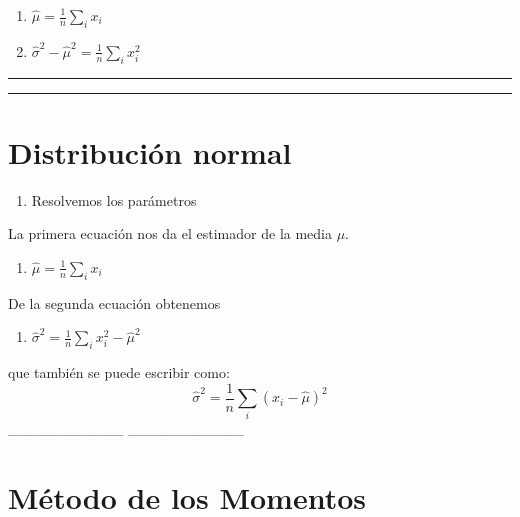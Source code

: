 \documentclass[
]{book}
\providecommand{\tightlist}{%
  \setlength{\itemsep}{0pt}\setlength{\parskip}{0pt}}
\begin{document}
\begin{enumerate}
\def\labelenumi{\alph{enumi}.}
\tightlist
\item
  \(\hat{\mu}=\frac{1}{n}\sum_i x_i\)
\item
  \(\hat{\sigma}^2-\hat{\mu}^2=\frac{1}{n}\sum_i x^2_i\)
\end{enumerate}

\begin{center}\rule{0.5\linewidth}{0.5pt}\end{center}

\begin{center}\rule{0.5\linewidth}{0.5pt}\end{center}

\hypertarget{distribuciuxf3n-normal-14}{%
\section{Distribución normal}\label{distribuciuxf3n-normal-14}}

\begin{enumerate}
\def\labelenumi{\arabic{enumi}.}
\setcounter{enumi}{2}
\tightlist
\item
  Resolvemos los parámetros
\end{enumerate}

La primera ecuación nos da el estimador de la media \(\mu\).

\begin{enumerate}
\def\labelenumi{\alph{enumi}.}
\tightlist
\item
  \(\hat{\mu}=\frac{1}{n}\sum_i x_i\)
\end{enumerate}

De la segunda ecuación obtenemos

\begin{enumerate}
\def\labelenumi{\alph{enumi}.}
\setcounter{enumi}{1}
\tightlist
\item
  \(\hat{\sigma}^2= \frac{1}{n} \sum_i x^2_i-\hat{\mu}^2\)
\end{enumerate}

que también se puede escribir como:
\[\hat{\sigma}^2=\frac{1}{n} \sum_i(x_i-\hat{\mu})^2\]
\_\_\_\_\_\_\_\_\_\_\_
\_\_\_\_\_\_\_\_\_\_\_

\hypertarget{muxe9todo-de-los-momentos-7}{%
\section{Método de los Momentos}\label{muxe9todo-de-los-momentos-7}}
\end{document}
